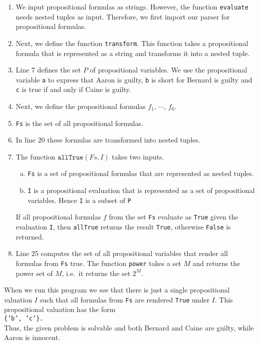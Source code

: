 \begin{enumerate}
\item We input propositional formulas as strings.  However, the function \texttt{evaluate} needs nested tuples
      as input.  Therefore, we first import our parser for propositional formulas.
\item Next, we define the function \texttt{transform}.  This function takes a propositional formula that is
      represented as a string and transforms it into a nested tuple.
\item Line 7 defines the set $P$ of propositional variables.  We use the propositional variable \texttt{a} to
      express that Aaron is guilty, \texttt{b} is short for Bernard is guilty and \texttt{c} is true if and
      only if Caine is guilty. 
\item Next, we define the propositional formulas $f_1$, $\cdots$, $f_6$.
\item \texttt{Fs} is the set of all propositional formulas.
\item In line 20 these formulas are transformed into nested tuples.
\item The function $\texttt{allTrue}(Fs, I)$ takes two inputs.
      \begin{enumerate}[(a)]
      \item \texttt{Fs} is a set of propositional formulas that are represented as nested tuples.
      \item \texttt{I} is a propositional evaluation that is represented as a set of propositional variables.
            Hence \texttt{I} is a subset of \texttt{P}
      \end{enumerate}
      If all propositional formulas $f$ from the set \texttt{Fs} evaluate as \texttt{True} given the evaluation
      \texttt{I}, then \texttt{allTrue} returns the result \texttt{True}, otherwise \texttt{False} is returned.
\item Line 25 computes the set of all propositional variables that render all formulas from \texttt{Fs} true.
      The function \texttt{power} takes a set $M$ and returns the power set of $M$, i.e.~it returns the set $2^M$.
\end{enumerate}
When we run this program we see that there is just a single propositional valuation $I$ such that all formulas
from \texttt{Fs} are rendered \texttt{True} under $I$.  This propositional valuation has the form
\\[0.2cm]
\hspace*{1.3cm}
\texttt{\{'b', 'c'\}.}
\\[0.2cm]
Thus, the given problem is solvable and both Bernard and Caine are guilty, while Aaron is innocent.
\pagebreak

